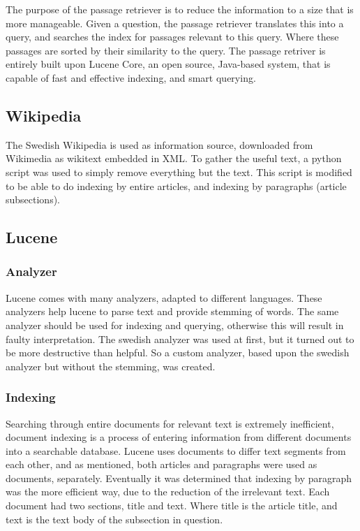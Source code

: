 The purpose of the passage retriever is to reduce the information to a size that is more manageable.
Given a question, the passage retriever translates this into a query, and searches the index for passages 
relevant to this query. Where these passages are sorted by their similarity to the query.
The passage retriver is entirely built upon Lucene Core, an open source, Java-based system, 
that is capable of fast and effective indexing, and smart querying.\cite{lucenecore}

\subsection{Wikipedia}
The Swedish Wikipedia is used as information source, downloaded from Wikimedia\cite{wikimedia} as wikitext embedded in XML.
To gather the useful text, a python script\cite{wikiextractor} was used to simply remove everything but the text. 
This script is modified to be able to do indexing by entire articles, and indexing by paragraphs (article subsections).

\subsection{Lucene}

\subsubsection{Analyzer}
Lucene comes with many analyzers, adapted to different languages. 
These analyzers help lucene to parse text and provide stemming of words.
The same analyzer should be used for indexing and querying, otherwise this will result in faulty interpretation.
The swedish analyzer was used at first, but it turned out to be more destructive than helpful. 
So a custom analyzer, based upon the swedish analyzer but without the stemming, was created.

\subsubsection{Indexing}
Searching through entire documents for relevant text is extremely inefficient, 
document indexing is a process of entering information from different documents into a searchable database. 
Lucene uses documents to differ text segments from each other, and as mentioned, both articles and paragraphs were used as documents, separately.
Eventually it was determined that indexing by paragraph was the more efficient way, due to the reduction of the irrelevant text.
Each document had two sections, title and text. Where title is the article title, and text is the text body of the subsection in question.

